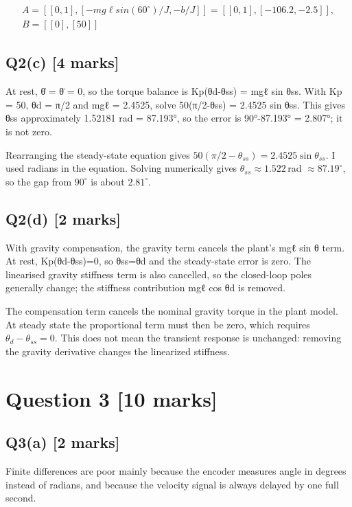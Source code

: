 \documentclass[11pt,a4paper]{article}
\begin{document}
\[\begin{aligned}A = [[0,1], [-mg\ell sin(60^{\circ})/J, -b/J]] = [[0,1], [-106.2, -2.5]],\\ B = [[0],[50]]\end{aligned}\]

\subsection*{Q2(c) \hfill [4 marks]}

At rest, θ̇ = θ̈ = 0, so the torque balance is Kp(θd-θss) = mgℓ sin θss.
With Kp = 50, θd = π/2 and mgℓ = 2.4525, solve 50(π/2-θss) = 2.4525 sin θss.
This gives θss approximately 1.52181 rad = 87.193°, so the error is 90°-87.193° = 2.807°; it is not zero.\par\smallskip Rearranging the steady-state equation gives $50(\pi/2-\theta_{ss})=2.4525\sin\theta_{ss}$. I used radians in the equation. Solving numerically gives $\theta_{ss}\approx1.522\,$rad $\approx87.19^\circ$, so the gap from $90^\circ$ is about $2.81^\circ$.

\subsection*{Q2(d) \hfill [2 marks]}

With gravity compensation, the gravity term cancels the plant's mgℓ sin θ term.
At rest, Kp(θd-θss)=0, so θss=θd and the steady-state error is zero.
The linearised gravity stiffness term is also cancelled, so the closed-loop poles generally change; the stiffness contribution mgℓ cos θd is removed.\par\smallskip The compensation term cancels the nominal gravity torque in the plant model. At steady state the proportional term must then be zero, which requires $\theta_d-\theta_{ss}=0$. This does not mean the transient response is unchanged: removing the gravity derivative changes the linearized stiffness.

\section*{Question 3 \hfill [10 marks]}
\subsection*{Q3(a) \hfill [2 marks]}

Finite differences are poor mainly because the encoder measures angle in degrees instead of radians, and because the velocity signal is always delayed by one full second.
\end{document}
